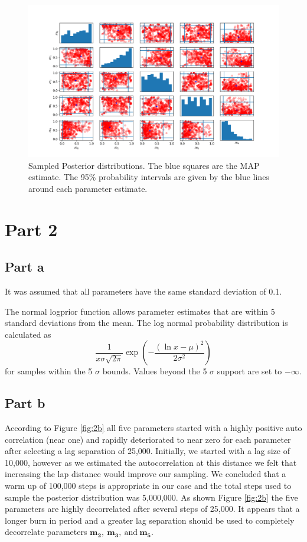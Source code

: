 \documentclass{article}
\begin{document}
\begin{figure}[!ht]
    \centering
    \includegraphics[width=5in]{Fig116.png}
    \caption{Sampled Posterior distributions. The blue squares are the MAP estimate. The 95\% probability intervals are given by the blue lines around each parameter estimate.}
    \label{p1_post_dist}
\end{figure}



\FloatBarrier


\section*{Part 2}
\subsection*{Part a}

It was assumed that all parameters have the same standard deviation of 0.1.

The normal logprior function allows parameter estimates that are within 5 standard deviations from the mean. The log normal probability distribution is calculated as
$$ 
\frac{1}{x \sigma \sqrt{2 \pi}} \exp \left(-\frac{(\ln x-\mu)^{2}}{2 \sigma^{2}}\right)
 $$
 for samples within the 5 $\sigma$ bounds. Values beyond the 5 $\sigma$ support are set to $-\infty$.
\FloatBarrier

\subsection*{Part b}

According to Figure \ref{fig:2b} all five parameters started with a highly positive auto correlation (near one) and rapidly deteriorated to near zero for each parameter after selecting a lag separation of 25,000.
Initially, we started with a lag size of 10,000, however as we estimated the autocorrelation at this distance we felt that increasing the lap distance would improve our sampling. We concluded that a warm up of 100,000 steps is appropriate in our case and the total steps used to sample the posterior distribution was 5,000,000. As shown Figure \ref{fig:2b} the five parameters are highly decorrelated after several steps of 25,000. It appears that a longer burn in period and a greater lag separation should be used to completely decorrelate parameters $\mathbf{m_2},~\mathbf{m_3},~\text{and}~\mathbf{m_5}$.
\end{document}
